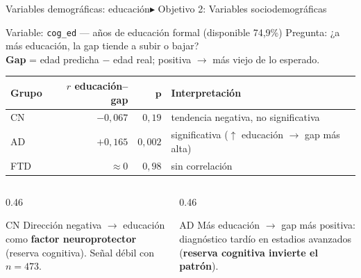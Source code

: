 \documentclass[aspectratio=169, 11pt]{beamer}
\begin{document}
\begin{frame}{Variables demográficas: educación}{\color{uncyellow}\scriptsize $\blacktriangleright$ Objetivo 2: Variables sociodemográficas}
  \begin{block}{Variable: \texttt{cog\_ed} --- años de educación formal (disponible 74,9\%)}
    {\small Pregunta: ¿a más educación, la gap tiende a subir o bajar?\\
    \textbf{Gap} = edad predicha $-$ edad real; positiva $\rightarrow$ más viejo de lo esperado.}
  \end{block}

  \vspace{0.2cm}
  \centering
  {\small
  \begin{tabular}{lrrl}
    \toprule
    \textbf{Grupo} & \textbf{$r$ educación--gap} & $\boldsymbol{p}$ & \textbf{Interpretación} \\
    \midrule
    CN  & $-0{,}067$ & $0{,}19$ & tendencia negativa, no significativa \\
    AD  & $+0{,}165$ & $0{,}002$ & significativa ($\uparrow$ educación $\rightarrow$ gap más alta) \\
    FTD & $\approx 0$ & $0{,}98$ & sin correlación \\
    \bottomrule
  \end{tabular}}

  \vspace{0.25cm}
  \begin{columns}[T]
    \begin{column}{0.46\textwidth}
      \begin{block}{CN}
        {\small Dirección negativa $\rightarrow$ educación como \textbf{factor neuroprotector} (reserva cognitiva). Señal débil con $n = 473$.}
      \end{block}
    \end{column}
    \begin{column}{0.46\textwidth}
      \begin{block}{AD}
        {\small Más educación $\rightarrow$ gap más positiva: diagnóstico tardío en estadios avanzados (\textbf{reserva cognitiva invierte el patrón}).}
      \end{block}
    \end{column}
  \end{columns}
\end{frame}
\end{document}
